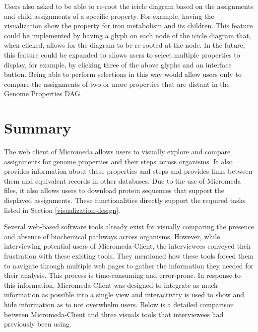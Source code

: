 Users also asked to be able to re-root the icicle diagram based on the assignments and child assignments of a specific property. For example, having the visualization show the property for iron metabolism and its children. This feature could be implemented by having a glyph on each node of the icicle diagram that, when clicked, allows for the diagram to be re-rooted at the node. In the future, this feature could be expanded to allows users to select multiple properties to display, for example, by clicking three of the above glyphs and an interface button. Being able to perform selections in this way would allow users only to compare the assignments of two or more properties that are distant in the Genome Properties DAG.

\section{Summary} 

The web client of Micromeda allows users to visually explore and compare assignments for genome properties and their steps across organisms. It also provides information about these properties and steps and provides links between them and equivalent records in other databases. Due to the use of Micromeda files, it also allows users to download protein sequences that support the displayed assignments. These functionalities directly support the required tasks listed in Section \ref{visualization-design}.

Several web-based software tools already exist for visually comparing the presence and absence of biochemical pathways across organisms. However, while interviewing potential users of Micromeda-Client, the interviewees conveyed their frustration with these existing tools. They mentioned how these tools forced them to navigate through multiple web pages to gather the information they needed for their analysis. This process is time-consuming and error-prone. In response to this information, Micromeda-Client was designed to integrate as much information as possible into a single view and interactivity is used to show and hide information as to not overwhelm users. Below is a detailed comparison between Micromeda-Client and three visuals tools that interviewees had previously been using.

